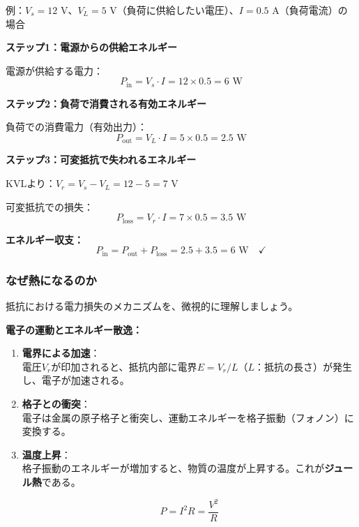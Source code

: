 \begin{screen}
例：$V_s = 12$ V、$V_L = 5$ V（負荷に供給したい電圧）、$I = 0.5$ A（負荷電流）の場合

\textbf{ステップ1：電源からの供給エネルギー}

電源が供給する電力：
\begin{equation}
P_{\text{in}} = V_s \cdot I = 12 \times 0.5 = 6 \text{ W}
\end{equation}

\textbf{ステップ2：負荷で消費される有効エネルギー}

負荷での消費電力（有効出力）：
\begin{equation}
P_{\text{out}} = V_L \cdot I = 5 \times 0.5 = 2.5 \text{ W}
\end{equation}

\textbf{ステップ3：可変抵抗で失われるエネルギー}

KVLより：$V_r = V_s - V_L = 12 - 5 = 7$ V

可変抵抗での損失：
\begin{equation}
P_{\text{loss}} = V_r \cdot I = 7 \times 0.5 = 3.5 \text{ W}
\end{equation}

\textbf{エネルギー収支：}
\begin{equation}
P_{\text{in}} = P_{\text{out}} + P_{\text{loss}} = 2.5 + 3.5 = 6 \text{ W} \quad \checkmark
\end{equation}
\end{screen}

\subsubsection{なぜ熱になるのか}

抵抗における電力損失のメカニズムを、微視的に理解しましょう。

\begin{screen}
\textbf{電子の運動とエネルギー散逸：}

\begin{enumerate}
\item \textbf{電界による加速}：\\
電圧$V_r$が印加されると、抵抗内部に電界$E = V_r/L$（$L$：抵抗の長さ）が発生し、電子が加速される。

\item \textbf{格子との衝突}：\\
電子は金属の原子格子と衝突し、運動エネルギーを格子振動（フォノン）に変換する。

\item \textbf{温度上昇}：\\
格子振動のエネルギーが増加すると、物質の温度が上昇する。これが\textbf{ジュール熱}である。

\begin{equation}
P = I^2 R = \frac{V^2}{R}
\end{equation}
\end{enumerate}
\end{screen}

